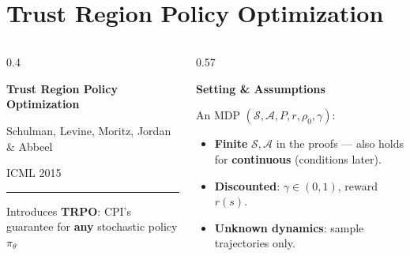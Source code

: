\documentclass[aspectratio=169]{beamer}
\begin{document}
\section{Trust Region Policy Optimization}


\begin{frame}
  \begin{columns}[c]
    \begin{column}{0.4\textwidth}
      \begin{tcolorbox}[colback=AtlasCool, colframe=AtlasCool, arc=3pt, boxrule=0pt,
                        height=0.8\textheight, valign=center, left=12pt, right=12pt]
        \color{white}\raggedright
        {\Large\bfseries Trust Region Policy Optimization\par}
        \vspace{12pt}
        {\large Schulman, Levine, Moritz, Jordan \& Abbeel\par}
        {\small ICML 2015\par}
        \vspace{16pt}
        {\color{white!80!AtlasCool}\rule{0.4\linewidth}{0.6pt}\par}
        \vspace{6pt}
        {\small Introduces \textbf{TRPO}: CPI's guarantee for \textbf{any} stochastic policy $\pi_\theta$\par}
      \end{tcolorbox}
    \end{column}
    \begin{column}{0.57\textwidth}
      {\large\bfseries\color{AtlasAccent}Setting \& Assumptions\par}
      \vspace{6pt}
      \small
      An MDP $(\mathcal{S}, \mathcal{A}, P, r, \rho_0, \gamma)$:
      \begin{itemize}
        \item \textbf{Finite} $\mathcal{S}, \mathcal{A}$ in the proofs --- also holds for \textbf{continuous} (conditions later).
        \item \textbf{Discounted}: $\gamma \in (0,1)$, reward $r(s)$.
        \item \textbf{Unknown dynamics}: sample trajectories only.

\end{itemize}
\end{column}
\end{columns}
\end{frame}
\end{document}
